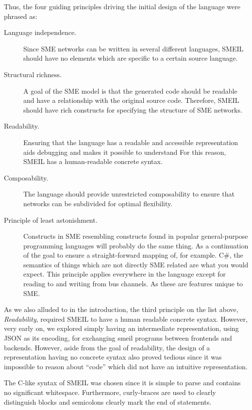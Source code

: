 Thus, the four guiding principles driving the initial design of the language
were phrased as:
\begin{description}
\item[Language independence.] Since SME networks can be written in several
  different languages, SMEIL should have no elements which are specific to a
  certain source language.
\item[Structural richness.] A goal of the SME model is that the generated code
  should be readable and have a relationship with the original source
  code. Therefore, SMEIL should have rich constructs for specifying the
  structure of SME networks.
\item[Readability.] Ensuring that the language has a readable and accessible
  representation aids debugging and makes it possible to understand For this
  reason, SMEIL has a human-readable concrete syntax.
\item[Composability.] The language should provide unrestricted composability to
  ensure that networks can be subdivided for optimal flexibility.
\item[Principle of least astonishment.] Constructs in SME resembling constructs
  found in popular general-purpose programming languages will probably do the
  same thing. As a continuation of the goal to ensure a straight-forward mapping
  of, for example. C\#, the semantics of things which are not directly SME
  related are what you would expect. This principle applies everywhere in the
  language except for reading to and writing from bus channels. As these are
  features unique to SME.
\end{description}



As we also alluded to in the introduction, the third principle on the list
above, {\itshape Readability}, required SMEIL to have a human readable concrete
syntax. However, very early on, we explored simply having an intermediate
representation, using JSON as its encoding, for exchanging \gls{smeil} programs
between frontends and backends. However, aside from the goal of readability, the
design of a representation having no concrete syntax also proved tedious since
it was impossible to reason about ``code'' which did not have an intuitive
representation.

The C-like syntax of SMEIL was chosen since it is simple to parse and contains
no significant whitespace. Furthermore, curly-braces are used to clearly
distinguish blocks and semicolons clearly mark the end of statements.
 
